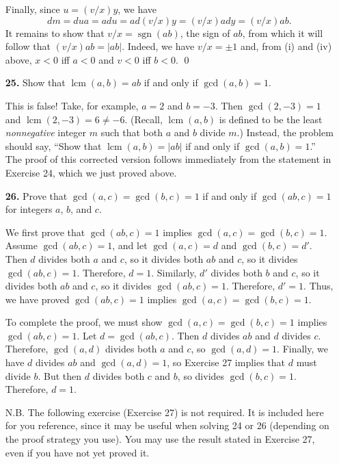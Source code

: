 \documentclass[12pt,reqno]{amsart}
\renewcommand{\sgn}{\ensuremath{\operatorname{sgn}}}
\newcommand{\lcm}{\operatorname{lcm}}
\begin{document}
\begin{enumerate}
Finally, since $u = (v/x)y$, we have 
\[
dm = dua = a d u = a d (v/x) y = (v/x) a d y = (v/x) ab.
\]
It remains to show that $v/x = \sgn(ab)$, the sign of $ab$, from which it will
follow that $(v/x)ab = |ab|$. Indeed, we have $v/x = \pm 1$ and, from (i) and (iv) above, 
$x< 0$ iff $a<0$ and $v<0$ iff $b<0$.
\qed


\bigskip

\item[{\bf 25.}]
Show that $\lcm(a,b) = ab$ if and only if $\gcd(a,b) = 1$.

\bigskip
{}
This is false!  Take, for example, $a = 2$ and $b = -3$.  Then $\gcd(2, -3) = 1$ and 
$\lcm(2, -3) = 6 \neq -6$. (Recall, $\lcm(a, b)$ is defined to be the least
\emph{nonnegative} integer $m$ such that both $a$ and $b$ divide $m$.)  
Instead, the problem should say,
``Show that $\lcm(a,b) = |ab|$ if and only if $\gcd(a,b) = 1$.''  The proof of
this corrected version follows immediately from the statement in Exercise 24,
which we just proved above. 

\bigskip

\item[{\bf 26.}]
Prove that $\gcd(a,c) = \gcd(b,c) =1$ if and only if $\gcd(ab,c) = 1$ for integers $a$, $b$, and $c$.

\medskip

 We first prove that $\gcd(ab,c) = 1$ implies
$\gcd(a,c) = \gcd(b,c) =1$.   
Assume $\gcd(ab,c) = 1$, and let $\gcd(a,c) = d$ and $\gcd(b,c) = d'$.
Then $d$ divides both $a$ and $c$, so it divides both
$ab$ and $c$, so it divides $\gcd(ab,c) = 1$.  Therefore, $d=1$.
Similarly, $d'$ divides both $b$ and $c$, so it divides both
$ab$ and $c$, so it divides $\gcd(ab,c) = 1$.  Therefore, $d'=1$.
Thus, we have proved $\gcd(ab,c) = 1$ implies $\gcd(a,c) = \gcd(b,c) =1$.

To complete the proof, we must show 
$\gcd(a,c) = \gcd(b,c) =1$ implies $\gcd(ab,c) = 1$.
Let $d = \gcd(ab,c)$.  Then $d$ divides $ab$ and $d$ divides $c$. 
Therefore, $\gcd(a,d)$ divides both $a$ and $c$, so 
$\gcd(a,d)=1$. Finally, we have $d$ divides $ab$ and $\gcd(a,d)=1$, 
so Exercise 27 implies that $d$ must divide $b$.  But then $d$ 
divides both $c$ and $b$, so divides $\gcd(b,c) = 1$.  Therefore,
$d = 1$.
\bigskip


\noindent N.B. The following exercise (Exercise 27) is not required. It is
included here for you reference, since it may be useful when solving 24 or 26
(depending on the proof strategy you use). You may use the result stated in
Exercise 27, even if you have not yet proved it. 


\end{enumerate}
\end{document}
